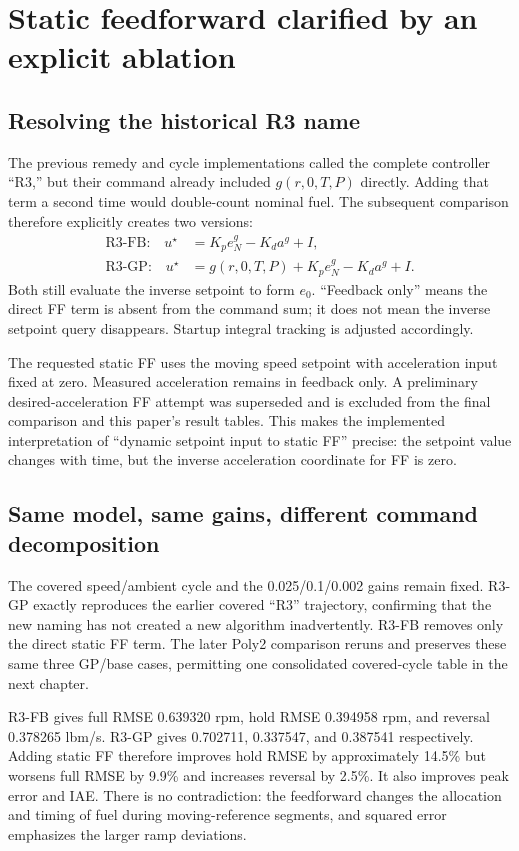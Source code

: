\documentclass[11pt,a4paper,oneside]{report}
\begin{document}
\chapter{Static feedforward clarified by an explicit ablation}
\section{Resolving the historical R3 name}
The previous remedy and cycle implementations called the complete controller ``R3,'' but their command already included $g(r,0,T,P)$ directly. Adding that term a second time would double-count nominal fuel. The subsequent comparison therefore explicitly creates two versions:
\begin{align}
\text{R3-FB:}\quad u^\star&=K_pe_N^g-K_da^g+I,\\
\text{R3-GP:}\quad u^\star&=g(r,0,T,P)+K_pe_N^g-K_da^g+I.
\end{align}
Both still evaluate the inverse setpoint to form $e_0$. ``Feedback only'' means the direct FF term is absent from the command sum; it does not mean the inverse setpoint query disappears. Startup integral tracking is adjusted accordingly.

The requested static FF uses the moving speed setpoint with acceleration input fixed at zero. Measured acceleration remains in feedback only. A preliminary desired-acceleration FF attempt was superseded and is excluded from the final comparison and this paper's result tables. This makes the implemented interpretation of ``dynamic setpoint input to static FF'' precise: the setpoint value changes with time, but the inverse acceleration coordinate for FF is zero.

\section{Same model, same gains, different command decomposition}
The covered speed/ambient cycle and the 0.025/0.1/0.002 gains remain fixed. R3-GP exactly reproduces the earlier covered ``R3'' trajectory, confirming that the new naming has not created a new algorithm inadvertently. R3-FB removes only the direct static FF term. The later Poly2 comparison reruns and preserves these same three GP/base cases, permitting one consolidated covered-cycle table in the next chapter.

R3-FB gives full RMSE 0.639320 rpm, hold RMSE 0.394958 rpm, and reversal 0.378265 lbm/s. R3-GP gives 0.702711, 0.337547, and 0.387541 respectively. Adding static FF therefore improves hold RMSE by approximately 14.5\% but worsens full RMSE by 9.9\% and increases reversal by 2.5\%. It also improves peak error and IAE. There is no contradiction: the feedforward changes the allocation and timing of fuel during moving-reference segments, and squared error emphasizes the larger ramp deviations.
\end{document}
